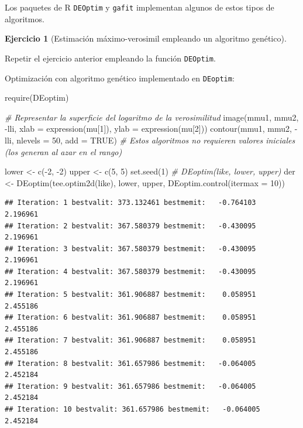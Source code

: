 \documentclass[
]{book}
\newenvironment{Shaded}{\begin{snugshade}}{\end{snugshade}}
\newcommand{\AttributeTok}[1]{\textcolor[rgb]{0.77,0.63,0.00}{#1}}
\newcommand{\CommentTok}[1]{\textcolor[rgb]{0.56,0.35,0.01}{\textit{#1}}}
\newcommand{\ConstantTok}[1]{\textcolor[rgb]{0.00,0.00,0.00}{#1}}
\newcommand{\DecValTok}[1]{\textcolor[rgb]{0.00,0.00,0.81}{#1}}
\newcommand{\FunctionTok}[1]{\textcolor[rgb]{0.00,0.00,0.00}{#1}}
\newcommand{\NormalTok}[1]{#1}
\newcommand{\OtherTok}[1]{\textcolor[rgb]{0.56,0.35,0.01}{#1}}
\newcommand{\SpecialCharTok}[1]{\textcolor[rgb]{0.00,0.00,0.00}{#1}}
\theoremstyle{break}
\theoremstyle{definition}
\theoremstyle{definition}
\theoremstyle{definition}
\newtheorem{exercise}{Ejercicio}[chapter]
\theoremstyle{definition}
\theoremstyle{remark}
\begin{document}
Los paquetes de R \texttt{DEOptim} y \texttt{gafit} implementan algunos de estos
tipos de algoritmos.

\begin{exercise}[Estimación máximo-verosimil empleando un algoritmo genético]
\protect\hypertarget{exr:mv-DEoptim}{}{\label{exr:mv-DEoptim} {} }
\end{exercise}

Repetir el ejercicio anterior empleando la función \texttt{DEOptim}.

Optimización con algoritmo genético implementado en \texttt{DEoptim}:

\begin{Shaded}
\begin{Highlighting}[]
\FunctionTok{require}\NormalTok{(DEoptim)}

\CommentTok{\# Representar la superficie del logaritmo de la verosimilitud}
\FunctionTok{image}\NormalTok{(mmu1, mmu2, }\SpecialCharTok{{-}}\NormalTok{lli, }\AttributeTok{xlab =} \FunctionTok{expression}\NormalTok{(mu[}\DecValTok{1}\NormalTok{]), }\AttributeTok{ylab =} \FunctionTok{expression}\NormalTok{(mu[}\DecValTok{2}\NormalTok{]))}
\FunctionTok{contour}\NormalTok{(mmu1, mmu2, }\SpecialCharTok{{-}}\NormalTok{lli, }\AttributeTok{nlevels =} \DecValTok{50}\NormalTok{, }\AttributeTok{add =} \ConstantTok{TRUE}\NormalTok{)}
\CommentTok{\# Estos algoritmos no requieren valores iniciales (los generan al azar en el rango)}

\NormalTok{lower }\OtherTok{\textless{}{-}} \FunctionTok{c}\NormalTok{(}\SpecialCharTok{{-}}\DecValTok{2}\NormalTok{, }\SpecialCharTok{{-}}\DecValTok{2}\NormalTok{)}
\NormalTok{upper }\OtherTok{\textless{}{-}} \FunctionTok{c}\NormalTok{(}\DecValTok{5}\NormalTok{, }\DecValTok{5}\NormalTok{)}
\FunctionTok{set.seed}\NormalTok{(}\DecValTok{1}\NormalTok{)}
\CommentTok{\# DEoptim(like, lower, upper)}
\NormalTok{der }\OtherTok{\textless{}{-}} \FunctionTok{DEoptim}\NormalTok{(}\FunctionTok{tee.optim2d}\NormalTok{(like), lower, upper, }\FunctionTok{DEoptim.control}\NormalTok{(}\AttributeTok{itermax =} \DecValTok{10}\NormalTok{))}
\end{Highlighting}
\end{Shaded}

\begin{verbatim}
## Iteration: 1 bestvalit: 373.132461 bestmemit:   -0.764103    2.196961
## Iteration: 2 bestvalit: 367.580379 bestmemit:   -0.430095    2.196961
## Iteration: 3 bestvalit: 367.580379 bestmemit:   -0.430095    2.196961
## Iteration: 4 bestvalit: 367.580379 bestmemit:   -0.430095    2.196961
## Iteration: 5 bestvalit: 361.906887 bestmemit:    0.058951    2.455186
## Iteration: 6 bestvalit: 361.906887 bestmemit:    0.058951    2.455186
## Iteration: 7 bestvalit: 361.906887 bestmemit:    0.058951    2.455186
## Iteration: 8 bestvalit: 361.657986 bestmemit:   -0.064005    2.452184
## Iteration: 9 bestvalit: 361.657986 bestmemit:   -0.064005    2.452184
## Iteration: 10 bestvalit: 361.657986 bestmemit:   -0.064005    2.452184
\end{verbatim}
\end{document}
